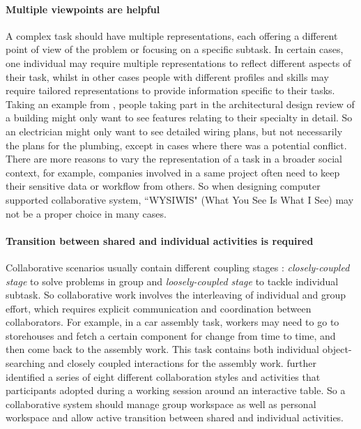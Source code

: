 \paragraph{Multiple viewpoints are helpful} A complex task should have multiple representations, each offering a different point of view of the problem or focusing on a specific subtask. In certain cases, one individual may require multiple representations to reflect different aspects of their task, whilst in other cases people with different profiles and skills may require tailored representations to provide information specific to their tasks. Taking an example from \citet{Churchill1998CVE}, people taking part in the architectural design review of a building might only want to see features relating to their specialty in detail. So an electrician might only want to see detailed wiring plans, but not necessarily the plans for the plumbing, except in cases where there was a potential conflict. There are more reasons to vary the representation of a task in a broader social context, for example, companies involved in a same project often need to keep their sensitive data or workflow from others. So when designing computer supported collaborative system, ``WYSIWIS" (What You See Is What I See) \citep{Stefik1987WYSIWIS} may not be a proper choice in many cases.

\paragraph{Transition between shared and individual activities is required} Collaborative scenarios usually contain different coupling stages \citep{Gutwin1998Design, Lissermann2014PMC}: \textit{closely-coupled stage} to solve problems in group and \textit{loosely-coupled stage} to tackle individual subtask. So collaborative work involves the interleaving of individual and group effort, which requires explicit communication and coordination between collaborators. For example, in a car assembly task, workers may need to go to storehouses and fetch a certain component for change from time to time, and then come back to the assembly work. This task contains both individual object-searching and closely coupled interactions for the assembly work. \citet{Isenberg2012Co} further identified a series of eight different collaboration styles and activities that participants adopted during a working session around an interactive table. So a collaborative system should manage group workspace as well as personal workspace and allow active transition between shared and individual activities.


